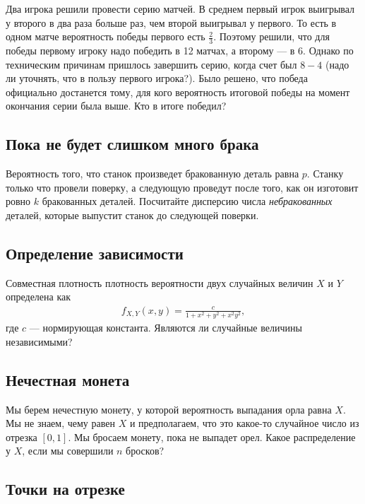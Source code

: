 \documentclass[12pt]{article}
\begin{document}
Два игрока решили провести серию матчей. В среднем первый игрок выигрывал у второго в два раза больше раз, чем второй выигрывал у первого. То есть в одном матче вероятность победы первого есть $\frac{2}{3}$. Поэтому решили, что для победы первому игроку надо победить в 12 матчах, а второму --- в 6. Однако по техническим причинам пришлось завершить серию, когда счет был $8-4$ (надо ли уточнять, что в пользу первого игрока?). Было решено, что победа официально достанется тому, для кого вероятность итоговой победы на момент окончания серии была выше. Кто в итоге победил?



\subsection{Пока не будет слишком много брака}

Вероятность того, что станок произведет бракованную деталь равна $p$. Станку только что провели поверку, а следующую проведут после того, как он изготовит ровно $k$ бракованных деталей. Посчитайте дисперсию числа \emph{небракованных} деталей, которые выпустит станок до следующей поверки.



\subsection{Определение зависимости}

Совместная плотность плотность вероятности двух случайных величин $X$ и $Y$ определена как
\begin{align*}
    f_{X, Y}(x, y) = \frac{c}{1 + x^2 + y^2 + x^2y^2},
\end{align*}
где $c$ --- нормирующая константа. Являются ли случайные величины независимыми?



\subsection{Нечестная монета}

Мы берем нечестную монету, у которой вероятность выпадания орла равна $X$. Мы не знаем, чему равен $X$ и предполагаем, что это какое-то случайное число из отрезка $[0, 1]$. Мы бросаем монету, пока не выпадет орел. Какое распределение у $X$, если мы совершили $n$ бросков?



\subsection{Точки на отрезке}
\end{document}
